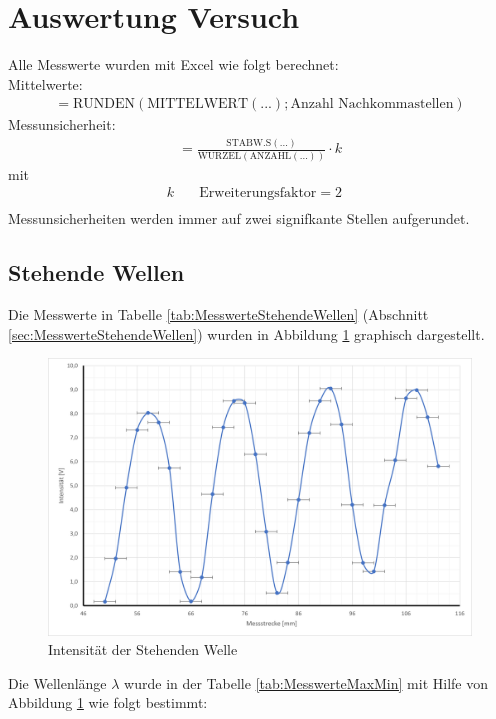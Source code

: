 \documentclass[a4paper]{scrartcl}
\numberwithin{equation}{subsection}
\begin{document}
\section{Auswertung Versuch}
\label{sec:runden}
Alle Messwerte wurden mit Excel wie folgt berechnet:\\
Mittelwerte:
\begin{align}
=\text{RUNDEN}(\text{MITTELWERT}(...);\text{Anzahl Nachkommastellen})
\label{eq:mittelWert}
\end{align}
Messunsicherheit:
\begin{align}
=\frac{\text{STABW.S}(...)}{\text{WURZEL}(\text{ANZAHL}(...))} \cdot k
\label{eq:Unsicherheit}
\end{align}
mit
\begin{align*}
k \quad &\text{Erweiterungsfaktor} = 2&\\
\end{align*}
Messunsicherheiten werden immer auf zwei signifkante Stellen aufgerundet.
\subsection{Stehende Wellen}
Die Messwerte in Tabelle \ref{tab:MesswerteStehendeWellen} (Abschnitt \ref{sec:MesswerteStehendeWellen}) wurden in Abbildung \ref{fig:DiagrammStehendeWelle} graphisch dargestellt.

\begin{figure}[H]
\includegraphics[width=12cm]{Diagramm_Stehende_Wellen}
\centering
\caption{Intensität der Stehenden Welle}
\centering
\label{fig:DiagrammStehendeWelle}
\end{figure}

Die Wellenlänge $\lambda$ wurde in der Tabelle \ref{tab:MesswerteMaxMin} mit Hilfe von Abbildung \ref{fig:DiagrammStehendeWelle} wie folgt bestimmt:
\end{document}
